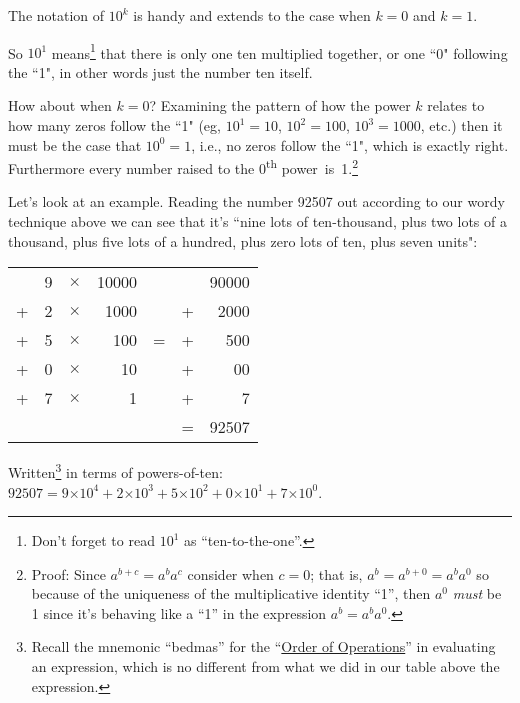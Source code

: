 \documentclass{article}
\begin{document}
The notation of $10^k$ is handy and extends
to the case when $k=0$ and $k=1$.

So $10^1$ means\footnote{Don't forget to read $10^1$
as ``ten-to-the-one''.} that there is only one ten multiplied together,
or one ``0" following the ``1",
in other words just the number ten itself.

How about when $k=0$?
Examining the pattern of how the power $k$ relates to how many zeros follow the ``1"
(eg, $10^1=10$, $10^2=100$, $10^3=1000$,
etc.) then it must be the case that $10^0=1$,
i.e., no zeros follow the ``1", which is exactly right.
Furthermore every number raised to the 0\textsuperscript{th}
power~is~1.\footnote{Proof: Since $a^{b+c}=a^ba^c$ consider when $c=0$; that is,
$a^b=a^{b+0}=a^ba^0$ so because of the uniqueness
of the multiplicative identity ``1'', then $a^0$ \emph{must} be 1 since it's behaving 
like a ``1'' in the expression $a^b=a^ba^0$.}

Let's look at an example.
Reading the number 92507 out according to our wordy technique above we can see
that it's ``nine lots of ten-thousand,
plus two lots of a thousand, plus five lots of a hundred,
plus zero lots of ten, plus seven units":

\begin{center}
\begin{tabular}{r r r r c r r}
\phantom & 9 & $\times$ & 10000 & \phantom & \phantom & 90000\\
+ & 2 & $\times$ & 1000 & \phantom & + & 2000\\
+ & 5 & $\times$ & 100 & \; \; \; = \; \; \; & + & 500\\
+ & 0 & $\times$ & 10 & \phantom & + & 00\\
+ & 7 & $\times$ & 1 & \phantom & + & 7\\
\cline{6-7}
\phantom & \phantom & \phantom & \phantom & \phantom & = & 92507
\end{tabular}
\end{center}

Written\footnote{Recall the mnemonic ``bedmas'' for
the ``\href{https://en.wikipedia.org/wiki/Order_of_operations}{Order of Operations}'' in
evaluating an expression, which is no different from
what we did in our table above the expression.}
in terms of powers-of-ten:
$92507=9{\times{}}10^4+2{\times{}}10^3+5{\times{}}10^2+0{\times{}}10^1+7{\times{}}10^0$.
\end{document}
